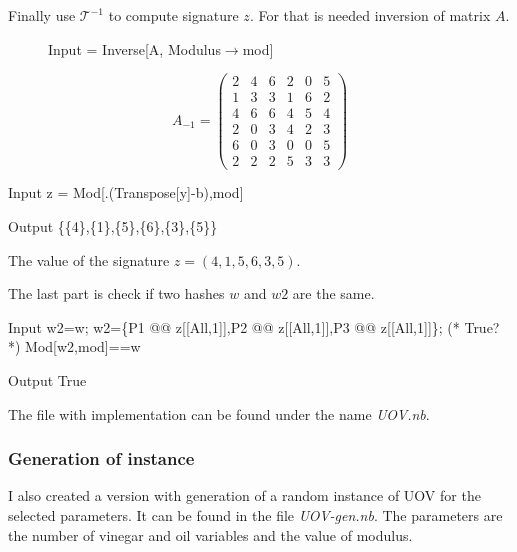 \documentclass[thesis=M,english]{FITthesis}[2019/12/23]
\begin{document}
\bigskip
\noindent
Finally use $\mathcal{T}^{-1}$ to compute signature $z$. For that is needed inversion of matrix $A$.
\begin{figure}[h]
	\begin{minipage}{0.59\textwidth}
		\centering
\begin{mmaCell}[moredefined={A, mod}]{Input}
   = Inverse[A, Modulus\(\pmb{\to}\)mod]
\end{mmaCell}
	\end{minipage}
	\begin{minipage}{0.28\textwidth}
		\centering
		\begin{equation*}
A_{-1} = 
\begin{pmatrix}
2 & 4 & 6 & 2 & 0 & 5 \\
1 & 3 & 3 & 1 & 6 & 2 \\
4 & 6 & 6 & 4 & 5 & 4 \\
2 & 0 & 3 & 4 & 2 & 3 \\
6 & 0 & 3 & 0 & 0 & 5 \\
2 & 2 & 2 & 5 & 3 & 3
\end{pmatrix}
\end{equation*}
	\end{minipage}
\end{figure}
\begin{mmaCell}[moredefined={z, A, y, b, mod}]{Input}
  z = Mod[.(Transpose[y]-b),mod] 
\end{mmaCell}
\begin{mmaCell}{Output}
  \{\{4\},\{1\},\{5\},\{6\},\{3\},\{5\}\}
\end{mmaCell}
The value of the signature $z = (4,1,5,6,3,5)$.

\bigskip
\noindent
The last part is check if two hashes $w$ and $w2$ are the same.
\begin{mmaCell}[moredefined={w2, w, P1, z, P2, P3, mod}]{Input}
  w2=w;
  w2=\{P1 @@ z[[All,1]],P2 @@ z[[All,1]],P3 @@ z[[All,1]]\};
  (* True? *)
  Mod[w2,mod]==w
\end{mmaCell}
\begin{mmaCell}[addtoindex=2]{Output}
  True
\end{mmaCell}
The file with implementation can be found under the name \textit{UOV.nb}.

\subsubsection{Generation of instance}
I also created a version with generation of a random instance of UOV for the selected parameters. It can be found in the file \textit{UOV-gen.nb}. The parameters are the number of vinegar and oil variables and the value of modulus.
\end{document}
